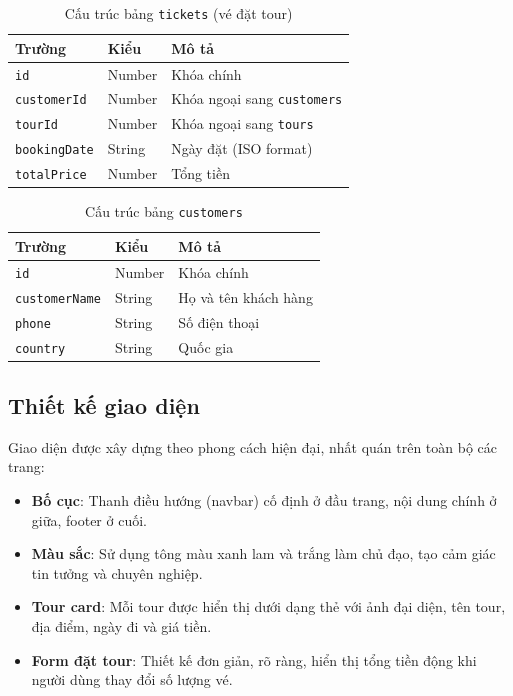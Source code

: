 \documentclass[12pt,a4paper]{article}
\begin{document}
\begin{table}[H]
\centering
\caption{Cấu trúc bảng \texttt{tickets} (vé đặt tour)}
\begin{tabularx}{\textwidth}{|l|l|X|}
\hline
\textbf{Trường} & \textbf{Kiểu} & \textbf{Mô tả} \\
\hline
\texttt{id}          & Number & Khóa chính \\
\hline
\texttt{customerId}  & Number & Khóa ngoại sang \texttt{customers} \\
\hline
\texttt{tourId}      & Number & Khóa ngoại sang \texttt{tours} \\
\hline
\texttt{bookingDate} & String & Ngày đặt (ISO format) \\
\hline
\texttt{totalPrice}  & Number & Tổng tiền \\
\hline
\end{tabularx}
\end{table}

\begin{table}[H]
\centering
\caption{Cấu trúc bảng \texttt{customers}}
\begin{tabularx}{\textwidth}{|l|l|X|}
\hline
\textbf{Trường} & \textbf{Kiểu} & \textbf{Mô tả} \\
\hline
\texttt{id}           & Number & Khóa chính \\
\hline
\texttt{customerName} & String & Họ và tên khách hàng \\
\hline
\texttt{phone}        & String & Số điện thoại \\
\hline
\texttt{country}      & String & Quốc gia \\
\hline
\end{tabularx}
\end{table}

\subsection{Thiết kế giao diện}

Giao diện được xây dựng theo phong cách hiện đại, nhất quán trên toàn bộ các trang:

\begin{itemize}[leftmargin=2cm]
  \item \textbf{Bố cục}: Thanh điều hướng (navbar) cố định ở đầu trang, nội dung chính ở giữa, footer ở cuối.
  \item \textbf{Màu sắc}: Sử dụng tông màu xanh lam và trắng làm chủ đạo, tạo cảm giác tin tưởng và chuyên nghiệp.
  \item \textbf{Tour card}: Mỗi tour được hiển thị dưới dạng thẻ với ảnh đại diện, tên tour, địa điểm, ngày đi và giá tiền.
  \item \textbf{Form đặt tour}: Thiết kế đơn giản, rõ ràng, hiển thị tổng tiền động khi người dùng thay đổi số lượng vé.
\end{itemize}
\end{document}

